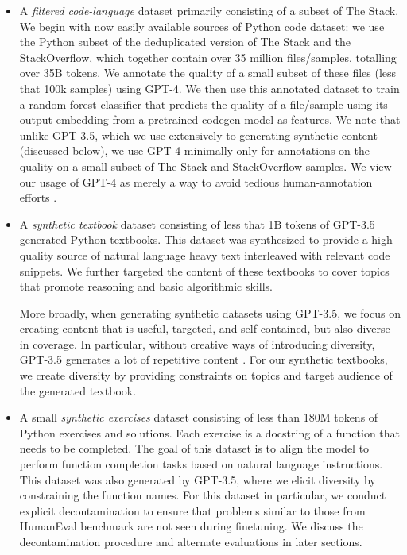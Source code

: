 \begin{itemize}
\item
A \textit{filtered code-language} dataset primarily consisting of a subset of The Stack. We begin with now easily available sources of Python code dataset: we use the Python subset of the deduplicated version of The Stack and the StackOverflow, which together contain over 35 million files/samples, totalling over 35B tokens. We annotate the quality of a small subset of these files (less that 100k samples) using GPT-4. We then use this annotated dataset to train a  random forest classifier that predicts the quality of a file/sample  using its output embedding from a pretrained codegen model as features. We note that unlike GPT-3.5, which we use extensively to generating synthetic content (discussed below), we use GPT-4 minimally only for annotations on the quality on a small subset of The Stack and StackOverflow samples. We view our usage of GPT-4 as merely a way to avoid tedious human-annotation efforts \cite{dubois2023alpacafarm}. 

\item
A \textit{synthetic textbook} dataset consisting of less that 1B tokens of GPT-3.5 generated Python textbooks. This dataset was synthesized to provide a high-quality source of natural language heavy text interleaved with relevant code snippets. We further targeted the content of these textbooks to cover topics that promote reasoning and basic algorithmic skills. 

More broadly, when generating synthetic datasets using GPT-3.5, we focus on creating content that is useful, targeted, and self-contained, but also diverse in coverage. In particular, without creative ways of introducing diversity, GPT-3.5 generates a lot of repetitive content \cite{eldan2023tinystories}. For our synthetic textbooks, we create diversity by providing constraints on topics and target audience of the generated textbook.

\item
A small \textit{synthetic exercises} dataset consisting of less than 180M tokens of Python exercises and solutions. Each exercise is a docstring of a function that needs to be completed. The goal of this dataset is to align the model to perform function completion tasks based on natural language instructions. This dataset was also generated by GPT-3.5, where we elicit diversity by constraining the function names. For this dataset in particular, we conduct explicit decontamination to ensure that problems similar to those from HumanEval benchmark are not seen during finetuning. We discuss the decontamination procedure and alternate evaluations in later sections. 

\end{itemize}
